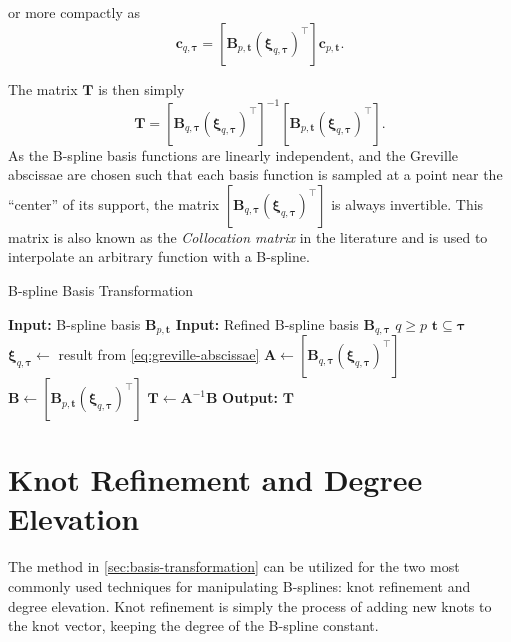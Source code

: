 or more compactly as
\begin{equation}
    [\mathbf B_{q,\boldsymbol \tau}(\boldsymbol \xi_{q,\boldsymbol \tau})^\top] \mathbf c_{q, \boldsymbol \tau} = [\mathbf B_{p,\mathbf t}(\boldsymbol \xi_{q,\boldsymbol \tau})^\top] \mathbf c_{p, \mathbf t}.
\end{equation}

The matrix $\mathbf T$ is then simply
\begin{equation}\label{eq:transformation-matrix-solution}
    \mathbf T = [\mathbf B_{q,\boldsymbol \tau}(\boldsymbol \xi_{q,\boldsymbol \tau})^\top]^{-1} [\mathbf B_{p,\mathbf t}(\boldsymbol \xi_{q,\boldsymbol \tau})^{\top}].
\end{equation}
As the B-spline basis functions are linearly independent, and the Greville abscissae are chosen such that each basis function is sampled at a point near the ``center'' of its support, the matrix $[\mathbf B_{q,\boldsymbol \tau}(\boldsymbol \xi_{q,\boldsymbol \tau})^\top]$ is always invertible. This matrix is also known as the \emph{Collocation matrix} in the literature  and is used to interpolate an arbitrary function with a B-spline.

\begin{algorithm}
    \caption{B-spline Basis Transformation}\label{alg:basis-transformation}
    \begin{algorithmic}[1]
        \State \textbf{Input:} B-spline basis $\mathbf{B}_{p,\mathbf{t}}$
        \State \textbf{Input:} Refined B-spline basis $\mathbf B_{q,\boldsymbol \tau}$
        \Ensure $q \geq p$
        \Ensure $\mathbf t \subseteq \boldsymbol \tau$
        \State $\boldsymbol \xi_{q, \boldsymbol \tau} \gets$ result from \cref{eq:greville-abscissae}
        \State $\mathbf A \gets [\mathbf B_{q,\boldsymbol \tau}(\boldsymbol \xi_{q,\boldsymbol \tau})^\top]$
        \State $\mathbf B \gets [\mathbf B_{p,\mathbf t}(\boldsymbol \xi_{q,\boldsymbol \tau})^\top]$
        \State $\mathbf T \gets \mathbf A^{-1} \mathbf B$
        \State \textbf{Output:} $\mathbf T$
    \end{algorithmic}
\end{algorithm}

\section{Knot Refinement and Degree Elevation}\label{sec:knot-refinement-degree-elevation}
The method in \cref{sec:basis-transformation} can be utilized for the two most commonly used techniques for manipulating B-splines: knot refinement and degree elevation. Knot refinement is simply the process of adding new knots to the knot vector, keeping the degree of the B-spline constant. 

